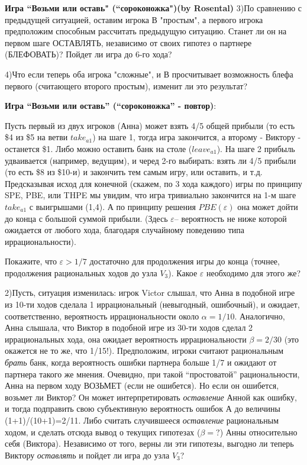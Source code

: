 \documentclass[a4paper,12pt]{article}
\begin{document}
\begin{exmp}{\bf Игра ``Возьми или оставь" (``сороконожка")(by Rosental)}
3)По сравнению с предыдущей ситуацией, оставим игрока В
"простым", а первого игрока предположим способным
рассчитать предыдущую ситуацию. Станет ли он на первом шаге
ОСТАВЛЯТЬ, независимо от своих гипотез о партнере
(БЛЕФОВАТЬ)? Пойдет ли игра до 6-го хода?

4)Что если теперь оба игрока "сложные", и В просчитывает
возможность блефа первого (считающего второго простым),
изменит ли это результат?
\end{exmp}


\begin{exmp}{\bf Игра ``Возьми или оставь'' (``сороконожка'' - повтор)}:\rm{}
%

Пусть первый из двух игроков (Анна) может взять 4/5 общей
прибыли (то есть \$4 из \$5 на ветви $take_{a1}$) на шаге
1, тогда игра закончится, а второму - Виктору - останется
\$1. Либо можно оставить банк на столе ($leave_{a1}$). На
шаге 2 прибыль удваивается (например, ведущим), и черед
2-го выбирать: взять ли 4/5 прибыли (то есть \$8 из \$10-и)
и закончить тем самым игру, или оставить, и т.д.
Предсказывая исход для конечной (скажем, по 3 хода каждого)
игры по принципу SPE, PBE, или THPE мы увидим, что игра
тривиально закончится на 1-м шаге $take_{a1}$ с выигрышами
(1,4). А по принципу решения $PBE(\varepsilon)$ она может
дойти до конца с большой суммой прибыли. (Здесь
$\varepsilon$-- вероятность не ниже которой ожидается от
любого хода, благодаря случайному поведению типа
иррациональности).

Покажите, что $\varepsilon >1/7$ достаточно для продолжения
игры до конца (точнее, продолжения рациональных ходов до
узла $V_3$). Какое $\varepsilon$ необходимо для этого же?

2)Пусть, ситуация изменилась: игрок Victor слышал, что Анна
в подобной игре из 10-ти ходов сделала 1 иррациональный
(невыгодный, ошибочный), и ожидает, соответственно,
вероятность иррациональности около $\alpha= 1/10$.
Аналогично,  Анна слышала, что Виктор в подобной игре из
30-ти ходов сделал 2 иррациональных хода, она ожидает
вероятность иррациональности $\beta= 2/30$ (это окажется не
то же, что 1/15!). Предположим, игроки считают рациональным
{\em брать} банк, когда вероятность ошибки партнера больше
1/7 и ожидают от партнера такого же мнения. Очевидно, при
такой ``простоватой'' рациональности, Анна на первом ходу
ВОЗЬМЕТ (если не ошибется). Но если он ошибется, возьмет ли
Виктор? Он может интерпретировать {\em оставление} Анной
как ошибку, и тогда подправить свою субъективную
вероятность ошибок А до величины (1+1)/(10+1)=2/11. Либо
считать случившееся {\em оставление} рациональным ходом, и
сделать отсюда вывод о текущих гипотезах ($\beta=?$) Анны
относительно себя (Виктора). Независимо от того, верны ли
эти гипотезы, выгодно ли теперь Виктору {\em оставлять} и
пойдет ли игра до узла $V_3$?


\end{exmp}
\end{document}
